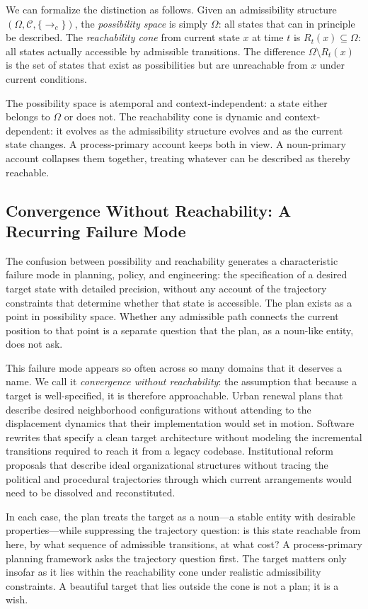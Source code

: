 \documentclass[12pt, a4paper]{article}
\theoremstyle{plain}
\theoremstyle{definition}
\theoremstyle{remark}
\begin{document}
We can formalize the distinction as follows. Given an admissibility structure
$(\Omega, \mathcal{C}, \{\to_c\})$, the \emph{possibility space} is simply
$\Omega$: all states that can in principle be described. The \emph{reachability
cone} from current state $x$ at time $t$ is $R_t(x) \subseteq \Omega$: all
states actually accessible by admissible transitions. The difference
$\Omega \setminus R_t(x)$ is the set of states that exist as possibilities
but are unreachable from $x$ under current conditions.

The possibility space is atemporal and context-independent: a state either
belongs to $\Omega$ or does not. The reachability cone is dynamic and
context-dependent: it evolves as the admissibility structure evolves and as
the current state changes. A process-primary account keeps both in view.
A noun-primary account collapses them together, treating whatever can be
described as thereby reachable.

\subsection{Convergence Without Reachability: A Recurring Failure Mode}

The confusion between possibility and reachability generates a characteristic
failure mode in planning, policy, and engineering: the specification of a
desired target state with detailed precision, without any account of the
trajectory constraints that determine whether that state is accessible.
The plan exists as a point in possibility space. Whether any admissible path
connects the current position to that point is a separate question that the
plan, as a noun-like entity, does not ask.

This failure mode appears so often across so many domains that it deserves
a name. We call it \emph{convergence without reachability}: the assumption
that because a target is well-specified, it is therefore approachable. Urban
renewal plans that describe desired neighborhood configurations without
attending to the displacement dynamics that their implementation would set
in motion. Software rewrites that specify a clean target architecture without
modeling the incremental transitions required to reach it from a legacy
codebase. Institutional reform proposals that describe ideal organizational
structures without tracing the political and procedural trajectories through
which current arrangements would need to be dissolved and reconstituted.

In each case, the plan treats the target as a noun---a stable entity with
desirable properties---while suppressing the trajectory question: is this
state reachable from here, by what sequence of admissible transitions, at
what cost? A process-primary planning framework asks the trajectory question
first. The target matters only insofar as it lies within the reachability
cone under realistic admissibility constraints. A beautiful target that lies
outside the cone is not a plan; it is a wish.
\end{document}
